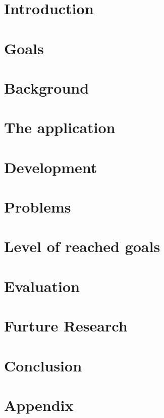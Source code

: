 \documentclass[a4paper,pt12]{article}
\begin{document}
\tableofcontents
\newpage

\section{Introduction}
\label{sec:introduction}



\section{Goals}
\label{sec:goals}


\section{Background}
\label{sec:background}


\section{The application}
\label{sec:application}


\section{Development}
\label{sec:development}


\section{Problems}
\label{sec:problems}


\section{Level of reached goals}
\label{sec:levelOfReachedGoals}


\section{Evaluation}
\label{sec:evaluation}


\section{Furture Research}
\label{sec:futureResearch}


\section{Conclusion}
\label{sec:conclusion}


\newpage

%
%

\newpage
\section{Appendix}

\end{document}
